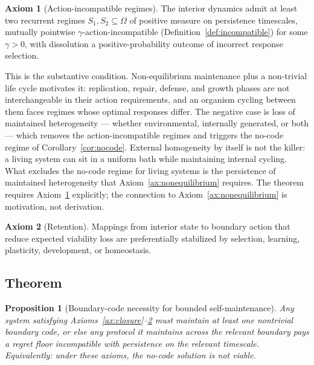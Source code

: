 \documentclass[12pt]{article}
\newtheorem{proposition}{Proposition}
\theoremstyle{definition}
\newtheorem{axiom}{Axiom}
\begin{document}
\begin{axiom}[Action-incompatible regimes]
\label{ax:incompat}
The interior dynamics admit at least two recurrent regimes $S_1, S_2 \subseteq \Omega$ of positive measure on persistence timescales, mutually pointwise $\gamma$-action-incompatible (Definition~\ref{def:incompatible}) for some $\gamma > 0$, with dissolution a positive-probability outcome of incorrect response selection.
\end{axiom}

This is the substantive condition. Non-equilibrium maintenance plus a non-trivial life cycle motivates it: replication, repair, defense, and growth phases are not interchangeable in their action requirements, and an organism cycling between them faces regimes whose optimal responses differ. The negative case is loss of maintained heterogeneity --- whether environmental, internally generated, or both --- which removes the action-incompatible regimes and triggers the no-code regime of Corollary~\ref{cor:nocode}. External homogeneity by itself is not the killer: a living system can sit in a uniform bath while maintaining internal cycling. What excludes the no-code regime for living systems is the persistence of maintained heterogeneity that Axiom~\ref{ax:nonequilibrium} requires. The theorem requires Axiom~\ref{ax:incompat} explicitly; the connection to Axiom~\ref{ax:nonequilibrium} is motivation, not derivation.

\begin{axiom}[Retention]
\label{ax:retention}
Mappings from interior state to boundary action that reduce expected viability loss are preferentially stabilized by selection, learning, plasticity, development, or homeostasis.
\end{axiom}

\subsection{Theorem}

\begin{proposition}[Boundary-code necessity for bounded self-maintenance]
\label{prop:universal}
Any system satisfying Axioms~\ref{ax:closure}--\ref{ax:retention} must maintain at least one nontrivial boundary code, or else any protocol it maintains across the relevant boundary pays a regret floor incompatible with persistence on the relevant timescale. Equivalently: under these axioms, the no-code solution is not viable.
\end{proposition}
\end{document}
